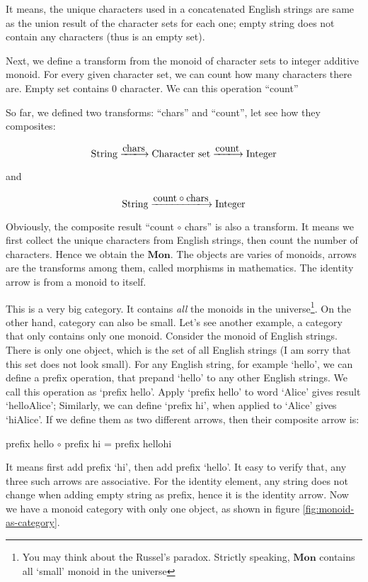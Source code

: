 \documentclass{article}
\begin{document}
It means, the unique characters used in a concatenated English strings are same as the union result of the character sets for each one; empty string does not contain any characters (thus is an empty set).

Next, we define a transform from the monoid of character sets to integer additive monoid. For every given character set, we can count how many characters there are. Empty set contains 0 character. We can this operation ``count''

So far, we defined two transforms: ``chars'' and ``count'', let see how they composites:

\[
\text{String} \arrowto{\text{chars}} \text{Character set} \arrowto{\text{count}} \text{Integer}
\]

and

\[
\text{String} \arrowto{\text{count} \circ \text{chars}} \text{Integer}
\]

Obviously, the composite result ``count $\circ$ chars'' is also a transform. It means we first collect the unique characters from English strings, then count the number of characters. Hence we obtain the  $\pmb{Mon}$. The objects are varies of monoids, arrows are the transforms among them, called morphisms in mathematics. The identity arrow is from a monoid to itself.

This is a very big category. It contains {\em all} the monoids in the universe\footnote{You may think about the Russel's paradox. Strictly speaking, $\pmb{Mon}$ contains all `small' monoid in the universe}. On the other hand, category can also be small. Let's see another example, a category that only contains only one monoid. Consider the monoid of English strings. There is only one object, which is the set of all English strings (I am sorry that this set does not look small). For any English string, for example `hello', we can define a prefix operation, that prepand `hello' to any other English strings. We call this operation as `prefix hello'. Apply `prefix hello' to word `Alice' gives result `helloAlice'; Similarly, we can define `prefix hi', when applied to `Alice' gives `hiAlice'. If we define them as two different arrows, then their composite arrow is:

\begin{center}
prefix hello $\circ$ prefix hi = prefix hellohi
\end{center}

It means first add prefix `hi', then add prefix `hello'. It easy to verify that, any three such arrows are associative. For the identity element, any string does not change when adding empty string as prefix, hence it is the identity arrow. Now we have a monoid category with only one object, as shown in figure \ref{fig:monoid-as-category}.
\end{document}
